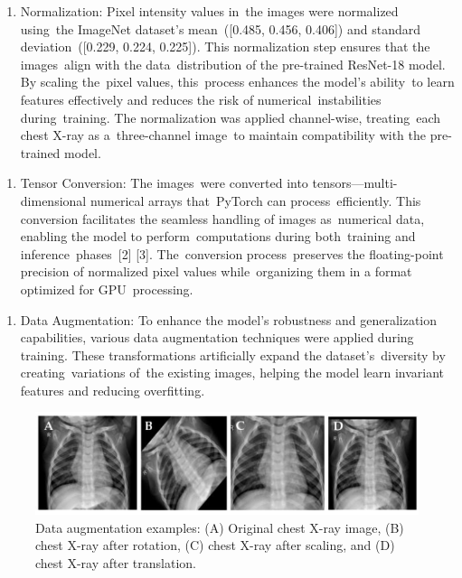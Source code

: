 \documentclass[
  twocolumn,
  10pt,
  a4paper,
  journal
]{IEEEtran}
\begin{document}
\begin{enumerate}
\def\labelenumi{\arabic{enumi}.}
\setcounter{enumi}{1}
\item
  Normalization: Pixel intensity values in~the images were normalized
  using~the ImageNet dataset's mean~({[}0.485, 0.456, 0.406{]}) and standard deviation~({[}0.229, 0.224, 0.225{]}). This
  normalization step ensures that the images~align with the
  data~distribution of the pre-trained ResNet-18 model. By scaling
  the~pixel values, this~process enhances the model's ability~to learn features effectively and reduces the risk of
  numerical~instabilities during~training. The normalization was applied
  channel-wise, treating~each chest X-ray as a~three-channel image~to
  maintain compatibility with the pre-trained model.
\end{enumerate}

\begin{enumerate}
\def\labelenumi{\arabic{enumi}.}
\setcounter{enumi}{2}
\item
  Tensor Conversion: The images~were converted into
  tensors---multi-dimensional numerical arrays that~PyTorch can
  process~efficiently. This conversion facilitates the seamless handling
  of images as~numerical data, enabling the model to
  perform~computations during both~training and inference~phases~{[}2{]}
  {[}3{]}. The~conversion process~preserves the floating-point precision
  of normalized pixel values while~organizing them in a format optimized
  for GPU~processing.
\end{enumerate}

\begin{enumerate}
\def\labelenumi{\arabic{enumi}.}
\setcounter{enumi}{3}
\item
  Data Augmentation: To enhance the model's robustness
  and generalization capabilities, various data augmentation techniques
  were applied during training. These transformations artificially
  expand the dataset's~diversity by creating~variations
  of~the existing images, helping the model learn invariant features and
  reducing overfitting.
\end{enumerate}

\begin{figure}[!t]
\centering
\includegraphics[width=\columnwidth]{figures/figure3.png}
\caption{Data augmentation examples: (A) Original chest X-ray image, (B) chest X-ray after rotation, (C) chest X-ray after scaling, and (D) chest X-ray after translation.}
\label{fig:data_augmentation}
\end{figure}
\end{document}
